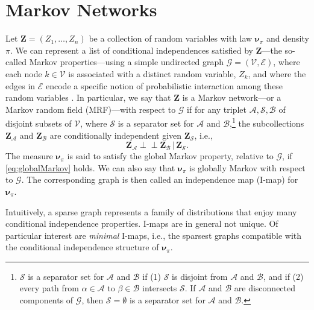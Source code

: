 \documentclass[twoside,11pt]{article}
\newcommand{\orth}{ \perp\!\!\!\perp }  %
\newcommand{\genm}{\boldsymbol{\nu} }   %
\newcommand{\Bc}{\mathcal{B}}
\newcommand{\Vc}{\mathcal{V}}
\newcommand{\Ec}{\mathcal{E}}
\newcommand{\Ac}{\mathcal{A}}
\newcommand{\Sc}{\mathcal{S}}
\newcommand{\Zb}{\boldsymbol{Z}}
\newcommand{\Gcb}{\boldsymbol{\mathcal{G}}}
\newcommand{\Aset}{ \Ac }
\newcommand{\Bset}{ \Bc }
\newcommand{\Sset}{ \Sc }
\begin{document}
\section{Markov Networks}
%
\label{sec:markov}
%
%
Let $\Zb=(Z_1,\ldots,Z_n)$ be a collection of
random variables with law
$\genm_\pi$ and density $\pi$.
%
%
We can represent a list of conditional
independences satisfied by 
%
%
$\Zb$---the so-called Markov properties---using a simple
undirected graph $\Gcb=(\Vc,\Ec)$,
where each node %
$k \in \Vc$ %
is associated
with 
a  distinct random variable, $Z_k$,
and where the
edges in $\Ec$  encode
a specific notion of probabilistic interaction
among these random variables \citep{koller2009probabilistic}.
%
%
In particular, we say that $\Zb$ is a Markov
network---or a Markov random field (MRF)---with respect to $\Gcb$ if for any triplet 
$\Aset,\Sset,\Bset$ of
disjoint subsets of $\Vc$, where $\Sset$ is a 
%
%
separator set for $\Aset$ and $\Bset$,\footnote{
$\Sset$ is a separator set for 
$\Aset$ and $\Bset$ if (1) $\Sset$ is disjoint from
$\Aset$ and $\Bset$, and if (2)
every path %
from $\alpha \in \Aset$ to $\beta \in \Bset$ intersects $\Sset$.
If $\Aset$ and $\Bset$ are disconnected components of $\Gcb$, then
$\Sset = \emptyset$ is a separator set for  $\Aset$ and $\Bset$. 
} 
the subcollections
%
$\Zb_{\Aset} $
and $\Zb_{\Bset}$ 
%
are conditionally independent given $\Zb_{\Sset}$, i.e.,
\begin{equation} \label{eq:globalMarkov}
 \Zb_{\Aset} \orth  \Zb_{\Bset} \, \vert \, \Zb_{\Sset}.
\end{equation}
%
%
%
The measure $\genm_\pi$
%
is said to satisfy the global Markov property,
relative to $\Gcb$, if \eqref{eq:globalMarkov}  holds. 
%
We can also say that $\genm_\pi$ is globally Markov with respect to $\Gcb$.
The corresponding graph is then called an independence map (I-map) for 
$\genm_\pi$. %
%
%
%
%
%
%

%
%
%
%
%
%
%
%
%
%
%
%
%
%
%
%
%
%
%
%
%
%
%
%
%
%
%
Intuitively, a sparse graph  represents a family of distributions that enjoy many conditional
independence properties. 
I-maps are in general not unique.
%
%
%
%
Of particular interest are \textit{minimal} I-maps, i.e., the sparsest
graphs compatible with the conditional independence structure of $\genm_\pi$.
%
%
%
%
%
%
\end{document}
